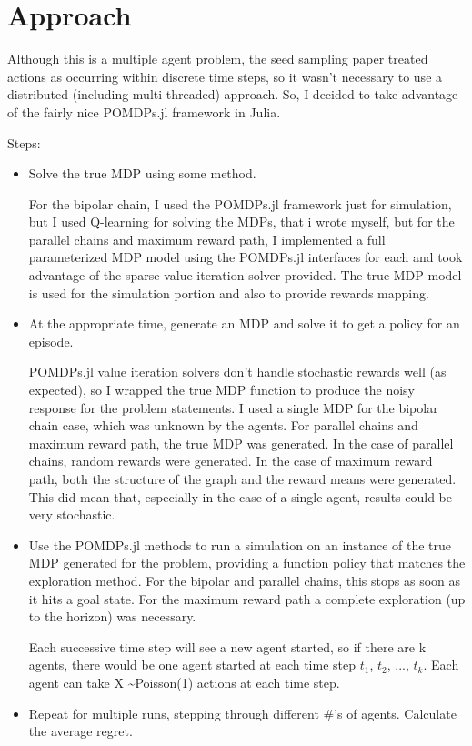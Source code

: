 \documentclass{article}
\begin{document}
\section{Approach}
Although this is a multiple agent problem, the seed sampling paper treated actions as occurring within discrete time steps, so it wasn't necessary to use a distributed (including multi-threaded) approach. So, I decided to take advantage of the fairly nice POMDPs.jl framework in Julia. 

Steps:

  \begin{itemize}
  
\item Solve the true MDP using some method. 

For the bipolar chain, I used the POMDPs.jl framework just for simulation, but I used Q-learning for solving the MDPs, that i wrote myself, but for the parallel chains and maximum reward path, I implemented a full parameterized MDP model using the POMDPs.jl interfaces for each and took advantage of the sparse value iteration solver provided. The true MDP model is used for the simulation portion and also to provide rewards mapping. 

\item At the appropriate time, generate an MDP and solve it to get a policy for an episode. 

POMDPs.jl value iteration solvers don't handle stochastic rewards well (as expected), so I wrapped the true MDP function to produce the noisy response for the problem statements. I used a single MDP for the bipolar chain case, which was unknown by the agents. For parallel chains and maximum reward path, the true MDP was generated. In the case of parallel chains, random rewards were generated. In the case of maximum reward path, both the structure of the graph and the reward means were generated. This did mean that, especially in the case of a single agent, results could be very stochastic.
  
\item Use the POMDPs.jl methods to run a simulation on an instance of the true MDP generated for the problem, providing a function policy that matches the exploration method. For the bipolar and parallel chains, this stops as soon as it hits a goal state. For the maximum reward path a complete exploration (up to the horizon) was necessary.

Each successive time step will see a new agent started, so if there are k agents, there would be one agent started at each time step $t_1$, $t_2$, ..., $t_k$. Each agent can take X \textasciitilde Poisson(1)  actions at each time step. 
\item Repeat for multiple runs, stepping through different \#'s of agents. Calculate the average regret.

  
 \end{itemize}
 
\end{document}
